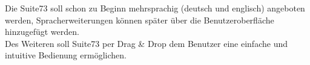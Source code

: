 Die Suite73 soll schon zu Beginn mehrsprachig (deutsch und englisch) angeboten werden, Spracherweiterungen können später über die Benutzeroberfläche hinzugefügt werden.\\
Des Weiteren soll Suite73 per Drag \& Drop dem Benutzer eine einfache und intuitive Bedienung ermöglichen.